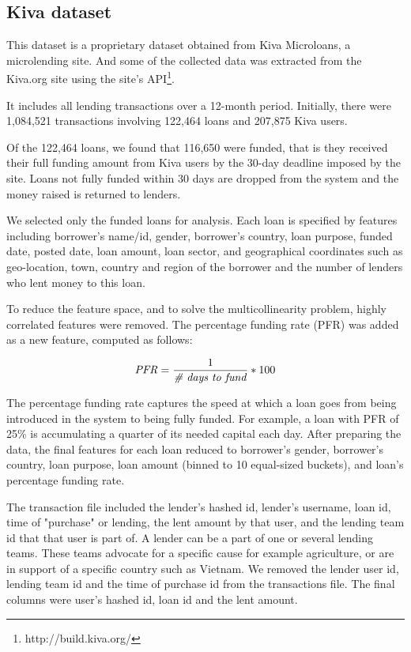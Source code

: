     \subsection{Kiva dataset}
    This dataset is a proprietary dataset obtained from Kiva Microloans, a microlending site. And some of the collected data was extracted from the Kiva.org site using the site's API\footnote{http://build.kiva.org/}.
    
    It includes all lending transactions over a 12-month period. Initially, there were 1,084,521 transactions involving 122,464 loans and 207,875 Kiva users.
    
    Of the 122,464 loans, we found that 116,650 were funded, that is they received their full funding amount from Kiva users by the 30-day deadline imposed by the site. Loans not fully funded within 30 days are dropped from the system and the money raised is returned to lenders.
    
    We selected only the funded loans for analysis. Each loan is specified by features including borrower's name/id, gender, borrower's country, loan purpose, funded date, posted date, loan amount, loan sector, and geographical coordinates such as geo-location, town, country and region of the borrower and the number of lenders who lent money to this loan.
    
    To reduce the feature space, and to solve the multicollinearity problem, highly correlated features were removed. The percentage funding rate (PFR) was added as a new feature, computed as follows:
    
    \begin{equation}
     \mbox{\textit{PFR}} =  \frac{1}{\mbox{\textit{{\#} days to fund}}} * 100 
    \end{equation}
    
    The percentage funding rate captures the speed at which a loan goes from being introduced in the system to being fully funded. For example, a loan with PFR of 25\% is accumulating a quarter of its needed capital each day. After preparing the data, the final features for each loan reduced to borrower's gender, borrower's country, loan purpose, loan amount (binned to 10 equal-sized buckets), and loan's percentage funding rate. 
    
    The transaction file included the lender's hashed id, lender's username, loan id, time of "purchase" or lending, the lent amount by that user, and the lending team id that that user is part of. A lender can be a part of one or several lending teams. These teams advocate for a specific cause for example agriculture, or are in support of a specific country such as Vietnam. We removed the lender user id, lending team id and the time of purchase id from the transactions file. The final columns were user's hashed id, loan id and the lent amount.
    
